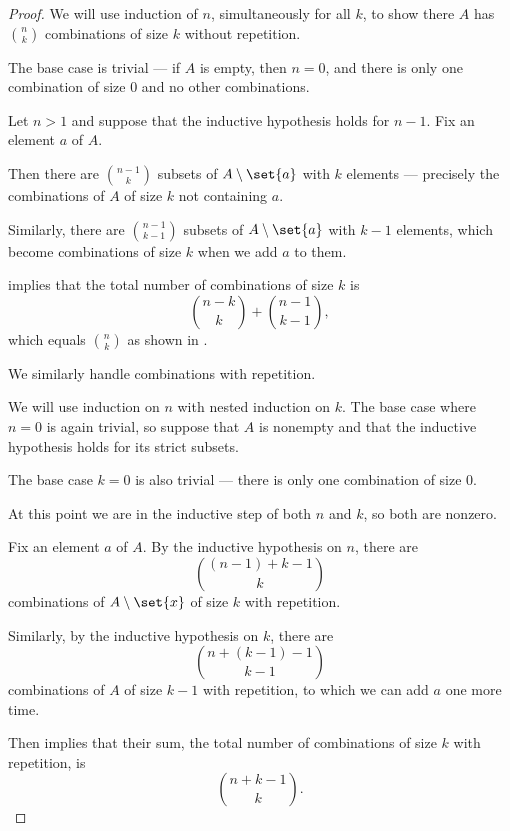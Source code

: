 \begin{proof}
   We will use induction of \( n \), simultaneously for all \( k \), to show there \( A \) has \( \binom n k \) combinations of size \( k \) without repetition.

  The base case is trivial --- if \( A \) is empty, then \( n = 0 \), and there is only one combination of size \( 0 \) and no other combinations.

  Let \( n > 1 \) and suppose that the inductive hypothesis holds for \( n - 1 \). Fix an element \( a \) of \( A \).

  Then there are \( \binom {n - 1} k \) subsets of \( A \setminus \set{ a } \) with \( k \) elements --- precisely the combinations of \( A \) of size \( k \) not containing \( a \).

  Similarly, there are \( \binom {n - 1} {k - 1} \) subsets of \( A \setminus \set{ a } \) with \( k - 1 \) elements, which become combinations of size \( k \) when we add \( a \) to them.

   implies that the total number of combinations of size \( k \) is
  \begin{equation*}
    \binom {n - k} k + \binom {n - 1} {k - 1},
  \end{equation*}
  which equals \( \binom n k \) as shown in .

   We similarly handle combinations with repetition.

  We will use induction on \( n \) with nested induction on \( k \). The base case where \( n = 0 \) is again trivial, so suppose that \( A \) is nonempty and that the inductive hypothesis holds for its strict subsets.

  The base case \( k = 0 \) is also trivial --- there is only one combination of size \( 0 \).

  At this point we are in the inductive step of both \( n \) and \( k \), so both are nonzero.

  Fix an element \( a \) of \( A \). By the inductive hypothesis on \( n \), there are
  \begin{equation*}
    \binom {(n - 1) + k - 1} k
  \end{equation*}
  combinations of \( A \setminus \set{ x } \) of size \( k \) with repetition.

  Similarly, by the inductive hypothesis on \( k \), there are
  \begin{equation*}
    \binom {n + (k - 1) - 1} {k - 1}
  \end{equation*}
  combinations of \( A \) of size \( k - 1 \) with repetition, to which we can add \( a \) one more time.

  Then  implies that their sum, the total number of combinations of size \( k \) with repetition, is
  \begin{equation*}
    \binom {n + k - 1} k.
  \end{equation*}
\end{proof}

